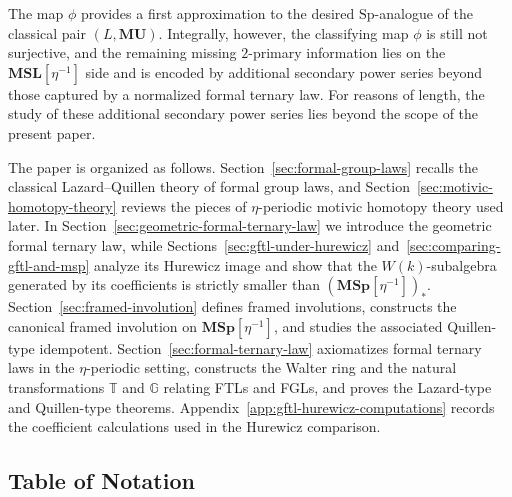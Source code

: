 \documentclass[a4paper]{amsart}
\theoremstyle{plain}
\theoremstyle{definition}
\newcommand{\Sp}{\mathrm{Sp}}
\newcommand{\MSp}{\mathbf{MSp}}
\newcommand{\MSL}{\mathbf{MSL}}
\newcommand{\MU}{\mathbf{MU}}
\newcommand{\etainv}{\eta^{-1}}
\newcommand{\MSpetainv}{{\MSp[\etainv]}}
\newcommand{\MSLetainv}{{\MSL[\etainv]}}
\begin{document}
The map $\phi$ provides a first approximation to the desired $\Sp$-analogue of the classical pair $(L,\MU)$. Integrally, however, the classifying map $\phi$ is still not surjective, and the remaining missing $2$-primary information lies on the $\MSLetainv$ side and is encoded by additional secondary power series beyond those captured by a normalized formal ternary law. For reasons of length, the study of these additional secondary power series lies beyond the scope of the present paper.

The paper is organized as follows. Section~\ref{sec:formal-group-laws} recalls the classical Lazard--Quillen theory of formal group laws, and Section~\ref{sec:motivic-homotopy-theory} reviews the pieces of $\eta$-periodic motivic homotopy theory used later. In Section~\ref{sec:geometric-formal-ternary-law} we introduce the geometric formal ternary law, while Sections~\ref{sec:gftl-under-hurewicz} and~\ref{sec:comparing-gftl-and-msp} analyze its Hurewicz image and show that the $W(k)$-subalgebra generated by its coefficients is strictly smaller than $(\MSpetainv)_*$. Section~\ref{sec:framed-involution} defines framed involutions, constructs the canonical framed involution on $\MSpetainv$, and studies the associated Quillen-type idempotent. Section~\ref{sec:formal-ternary-law} axiomatizes formal ternary laws in the $\eta$-periodic setting, constructs the Walter ring and the natural transformations $\mathbb{T}$ and $\mathbb{G}$ relating FTLs and FGLs, and proves the Lazard-type and Quillen-type theorems. Appendix~\ref{app:gftl-hurewicz-computations} records the coefficient calculations used in the Hurewicz comparison.

\subsection*{Table of Notation}\label{subsec:notation-table}
\end{document}
